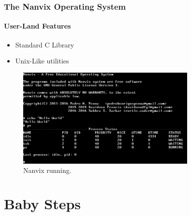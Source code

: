 \documentclass{beamer}
\begin{document}
		\begin{frame}
		\frametitle{The Nanvix Operating System}
		\framesubtitle{User-Land Features}
			\begin{itemize}
			\setlength\itemsep{0.5em}
				\item Standard C Library
				\item Unix-Like utilities

				\end{itemize}
				\begin{figure}
					\centering
					\includegraphics[width=0.8\textwidth]{nanvix}
					\caption{Nanvix running.}
				\end{figure}
		\end{frame}

\section{Baby Steps}
\end{document}
